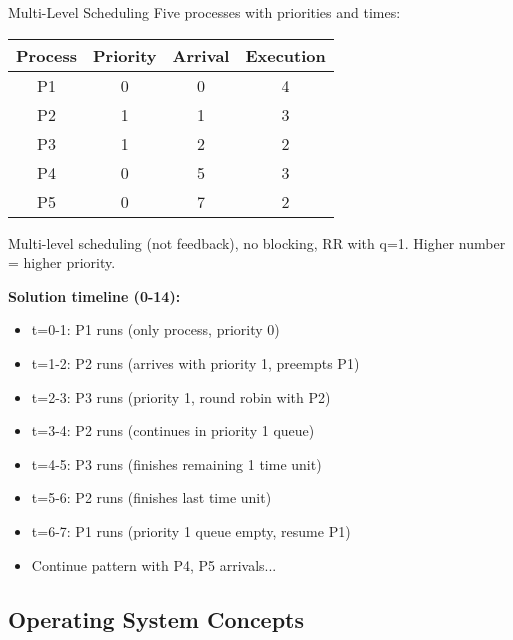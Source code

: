 \begin{example2}{Multi-Level Scheduling}
    Five processes with priorities and times:
    
    \begin{tabular}{|c|c|c|c|}
        \hline
        Process & Priority & Arrival & Execution \\
        \hline
        P1 & 0 & 0 & 4 \\
        P2 & 1 & 1 & 3 \\
        P3 & 1 & 2 & 2 \\
        P4 & 0 & 5 & 3 \\
        P5 & 0 & 7 & 2 \\
        \hline
    \end{tabular}
    
    Multi-level scheduling (not feedback), no blocking, RR with q=1.
    Higher number = higher priority.
    
    \tcblower
    
    \textbf{Solution timeline (0-14):}
    \begin{itemize}
        \item t=0-1: P1 runs (only process, priority 0)
        \item t=1-2: P2 runs (arrives with priority 1, preempts P1)
        \item t=2-3: P3 runs (priority 1, round robin with P2)
        \item t=3-4: P2 runs (continues in priority 1 queue)
        \item t=4-5: P3 runs (finishes remaining 1 time unit)
        \item t=5-6: P2 runs (finishes last time unit)
        \item t=6-7: P1 runs (priority 1 queue empty, resume P1)
        \item Continue pattern with P4, P5 arrivals...
    \end{itemize}
\end{example2}

\subsection{Operating System Concepts}

